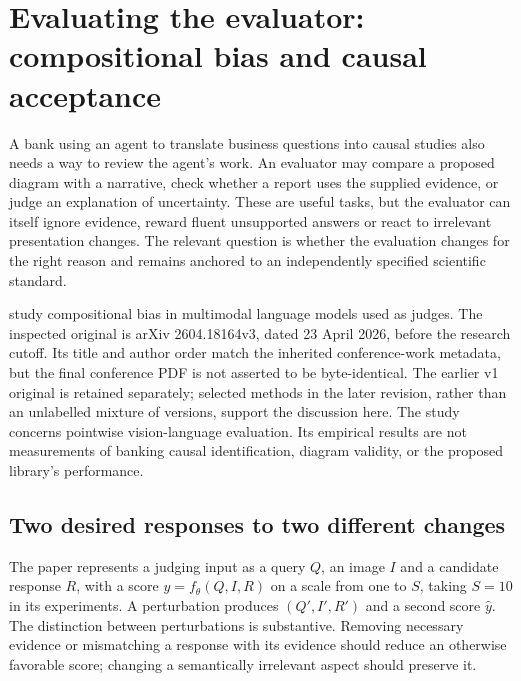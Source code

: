 \section{Evaluating the evaluator: compositional bias and causal acceptance}
\label{sec:exec24-judge-bias}

A bank using an agent to translate business questions into causal studies also
needs a way to review the agent's work. An evaluator may compare a proposed
diagram with a narrative, check whether a report uses the supplied evidence,
or judge an explanation of uncertainty. These are useful tasks, but the
evaluator can itself ignore evidence, reward fluent unsupported answers or
react to irrelevant presentation changes. The relevant question is whether
the evaluation changes for the right reason and remains anchored to an
independently specified scientific standard.~\citep{exec24_judgebias_reference}

\citet{exec24_judgebias_original} study compositional bias in multimodal
language models used as judges. The inspected original is arXiv
2604.18164v3, dated 23 April 2026, before the research cutoff. Its title and
author order match the inherited conference-work metadata, but the final
conference PDF is not asserted to be byte-identical. The earlier v1 original
is retained separately; selected methods in the later revision, rather than
an unlabelled mixture of versions, support the discussion here.
The study concerns pointwise vision-language evaluation. Its empirical
results are not measurements of banking causal identification, diagram
validity, or the proposed library's performance.
\citep{exec24_judgebias_original}

\subsection{Two desired responses to two different changes}

The paper represents a judging input as a query $Q$, an image $I$ and a
candidate response $R$, with a score $y=f_\theta(Q,I,R)$ on a scale from one
to $S$, taking $S=10$ in its experiments. A perturbation produces
$(Q',I',R')$ and a second score $\widehat y$. The distinction between
perturbations is substantive. Removing necessary evidence or mismatching a
response with its evidence should reduce an otherwise favorable score;
changing a semantically irrelevant aspect should preserve it.
\citep{exec24_judgebias_original}


